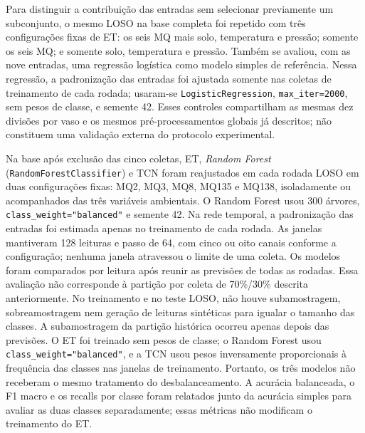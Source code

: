 Para distinguir a contribuição das entradas sem selecionar previamente
um subconjunto, o mesmo LOSO na base completa foi repetido com três
configurações fixas de ET: os seis MQ mais solo, temperatura e pressão;
somente os seis MQ; e somente solo, temperatura e pressão. Também se
avaliou, com as nove entradas, uma regressão logística como modelo
simples de referência. Nessa regressão, a padronização das entradas foi
ajustada somente nas coletas de treinamento de cada rodada; usaram-se
\texttt{LogisticRegression}, \texttt{max\_iter=2000}, sem pesos de classe,
e semente 42. Esses controles compartilham as mesmas dez divisões por
vaso e os mesmos pré-processamentos globais já descritos; não constituem
uma validação externa do protocolo experimental.

Na base após exclusão das cinco coletas, ET, \textit{Random Forest}
(\texttt{RandomForestClassifier}) e TCN foram reajustados em cada rodada
LOSO em duas configurações fixas: MQ2, MQ3, MQ8, MQ135 e MQ138, isoladamente ou
acompanhados das três variáveis ambientais. O Random Forest usou 300
árvores, \texttt{class\_weight="balanced"} e semente 42. Na rede temporal,
a padronização das entradas foi estimada apenas no treinamento de cada
rodada. As janelas mantiveram 128 leituras e passo de 64, com cinco ou oito
canais conforme a configuração; nenhuma janela atravessou o limite de
uma coleta.
Os modelos foram comparados por leitura após reunir as previsões de todas
as rodadas. Essa avaliação não corresponde à partição por coleta de 70\%/30\%
descrita anteriormente. No treinamento e no teste LOSO, não houve
subamostragem, sobreamostragem nem geração de leituras sintéticas para
igualar o tamanho das classes. A subamostragem da partição histórica
ocorreu apenas depois das previsões. O ET
foi treinado sem pesos de classe; o Random Forest usou
\texttt{class\_weight="balanced"}, e a TCN usou pesos inversamente
proporcionais à frequência das classes nas janelas de treinamento.
Portanto, os três modelos não receberam o mesmo tratamento do
desbalanceamento. A acurácia balanceada, o F1 macro e os recalls por
classe foram relatados junto da acurácia simples para avaliar as duas
classes separadamente; essas métricas não modificam o treinamento do ET.

